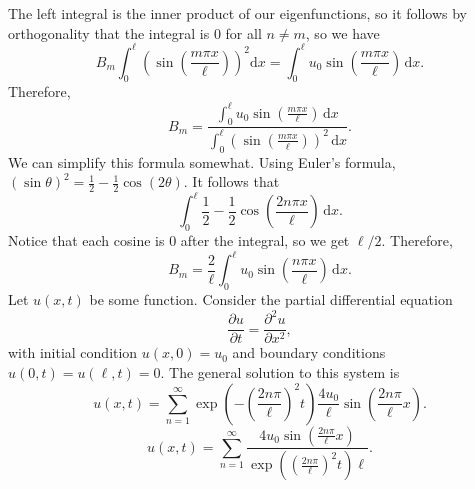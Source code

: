 The left integral is the inner product of our eigenfunctions, so it follows by orthogonality that the integral is $0$ for all $n\neq m$, so we have
\[
	B_m \int_{0}^{\ell }\left(\sin \left( \frac{m\pi x}{\ell } \right)\right)^2 \mathrm{d} x=\int_{0}^{\ell } u_0\sin \left( \frac{m\pi x}{\ell } \right)  \,\mathrm{d} x
.\]
Therefore,
\[
	B_m =\frac{\int_{0}^{\ell } u_0\sin \left( \frac{m\pi x}{\ell } \right)  \,\mathrm{d} x}{\int_{0}^{\ell } \left( \sin \left( \frac{m\pi x}{\ell } \right)  \right) ^2 \,\mathrm{d} x}
.\]
We can simplify this formula somewhat. Using Euler's formula, $\left( \sin \theta  \right) ^2=\frac{1}{2}-\frac{1}{2}\cos (2\theta )$. It follows that
\[
	\int_{0}^{\ell } \frac{1}{2}-\frac{1}{2}\cos \left( \frac{2n\pi x}{\ell } \right)  \,\mathrm{d} x
.\]
Notice that each cosine is $0 $ after the integral, so we get $\ell  /2$. Therefore,
\[
	B_m=\frac{2}{\ell }\int_{0}^{\ell } u_0 \sin \left( \frac{n\pi x}{\ell } \right)  \,\mathrm{d} x
.\]
Let $u(x,t)$ be some function. Consider the partial differential equation
\[
	\frac{\partial u}{\partial t} =\frac{\partial ^2u}{\partial x^2} ,
\]
with initial condition $u(x,0)=u_0$ and boundary conditions $u(0,t)=u(\ell ,t)=0$. The general solution to this system is
\[
	u(x,t)=\sum_{n=1}^{\infty} \exp \left( -\left( \frac{2n\pi }{\ell } \right) ^2t \right) \frac{4u_0}{\ell }\sin \left( \frac{2n\pi }{\ell }x \right) 
.\]
\[
	u(x,t)=\sum_{n=1}^{\infty} \frac{4u_0 \sin \left( \frac{2n\pi }{\ell }x \right) }{\exp \left( \left( \frac{2n\pi }{\ell } \right)^2 t  \right) \ell }
.\]


